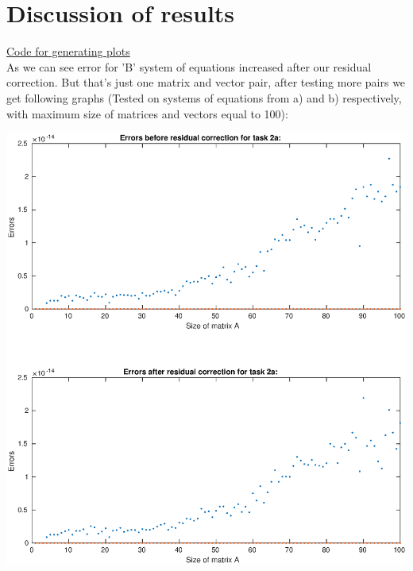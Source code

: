 \documentclass[12pt]{report}
\begin{document}
\newpage
\section{Discussion of results}
\hyperlink{function2_plot}{Code for generating plots}\\
As we can see error for 'B' system of equations increased after our residual correction. But that's just one matrix and vector pair, after testing more pairs we get following graphs (Tested on systems of equations from a) and b) respectively, with maximum size of matrices and vectors equal to 100):
\begin{center}
   \includegraphics[scale=0.5]{errorsA.eps}
\end{center}
\end{document}
